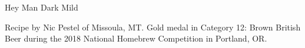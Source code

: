 \begin{recipe}{Hey Man Dark Mild}

\begin{aboutblock}
Recipe by Nic Pestel of Missoula, MT. Gold medal in Category 12: Brown British
Beer during the 2018 National Homebrew Competition in Portland, OR. 
\sourceaha
\end{aboutblock}


\begin{methodandtiming}

\begin{mashsteps}
\end{mashsteps}

\begin{fermentationsteps}
\end{fermentationsteps}

\end{methodandtiming}

\recipebreak

\begin{ingredientsblock}

\begin{malts}
\end{malts}

\begin{hops}
\end{hops}


\end{ingredientsblock}

\end{recipe}


